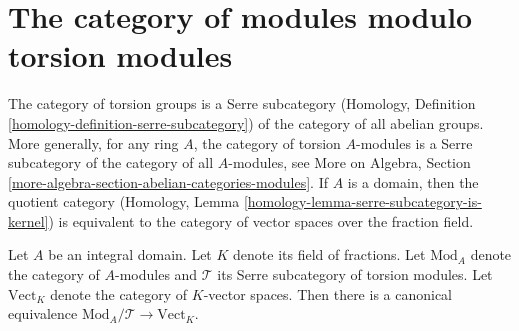 \section{The category of modules modulo torsion modules}
\label{section-serre-quotient-modulo-torsion-modules}

\noindent
The category of torsion groups is a Serre subcategory
(Homology, Definition \ref{homology-definition-serre-subcategory})
of the category of all abelian groups. More generally, for any ring $A$,
the category of torsion $A$-modules is a Serre subcategory of the
category of all $A$-modules, see
More on Algebra, Section \ref{more-algebra-section-abelian-categories-modules}.
If $A$ is a domain, then the quotient category
(Homology, Lemma \ref{homology-lemma-serre-subcategory-is-kernel})
is equivalent to the category of vector spaces over the fraction field.

\begin{proposition}
\label{proposition-quotient-by-torsion-modules}
Let $A$ be an integral domain. Let $K$ denote its field of fractions. Let
$\text{Mod}_A$ denote the category of $A$-modules and $\mathcal{T}$ its
Serre subcategory of torsion modules. Let $\text{Vect}_K$ denote the category
of $K$-vector spaces. Then there is a canonical equivalence
$\text{Mod}_A/\mathcal{T} \rightarrow \text{Vect}_K$.
\end{proposition}

